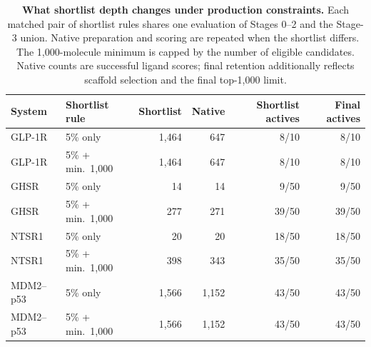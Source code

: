 \begin{table}[tbp]
\centering
\caption{\textbf{What shortlist depth changes under production constraints.} Each matched pair of shortlist rules shares one evaluation of Stages 0--2 and the Stage-3 union. Native preparation and scoring are repeated when the shortlist differs. The 1,000-molecule minimum is capped by the number of eligible candidates. Native counts are successful ligand scores; final retention additionally reflects scaffold selection and the final top-1,000 limit.}
\label{tab:efficiency}
\footnotesize
\setlength{\tabcolsep}{4pt}
\begin{tabular}{@{}llrrrr@{}}
\toprule
System & Shortlist rule & Shortlist & Native & Shortlist actives & Final actives \\
\midrule
GLP-1R & 5\% only & 1,464 & 647 & 8/10 & 8/10 \\
GLP-1R & 5\% + min.\ 1,000 & 1,464 & 647 & 8/10 & 8/10 \\
GHSR & 5\% only & 14 & 14 & 9/50 & 9/50 \\
GHSR & 5\% + min.\ 1,000 & 277 & 271 & 39/50 & 39/50 \\
NTSR1 & 5\% only & 20 & 20 & 18/50 & 18/50 \\
NTSR1 & 5\% + min.\ 1,000 & 398 & 343 & 35/50 & 35/50 \\
MDM2--p53 & 5\% only & 1,566 & 1,152 & 43/50 & 43/50 \\
MDM2--p53 & 5\% + min.\ 1,000 & 1,566 & 1,152 & 43/50 & 43/50 \\
\bottomrule
\end{tabular}
\end{table}
